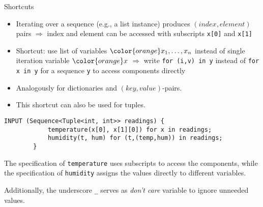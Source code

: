 \documentclass[%
beamer,%
english,%
10pt,%
]{beamer}
\newcommand{\blue}[1]{{\color{blue}#1}}
\newcommand{\orange}[1]{{\color{orange}#1}}
\begin{document}
\begin{frame}[fragile]{Shortcuts}
    \begin{itemize}
        \item Iterating over a sequence (e.g., a \blue{list} instance) produces $(\mathit{index},\mathit{element})$ pairs
            $\Rightarrow$ index and element can be accessed with subscripts \blue{\lstinline{x[0]}} and \blue{\lstinline{x[1]}}

        \item Shortcut:
            use list of variables $\orange{x_1,\dots,x_n}$ instead of single iteration variable $\orange{x}$
            $\Rightarrow$ write \blue{\lstinline{for (i,v) in y}} instead of \blue{\lstinline{for x in y}} for a sequence \blue{\lstinline{y}}
            to access components directly

        \item Analogously for dictionaries and $(\mathit{key},\mathit{value})$-pairs.

        \item This shortcut can also be used for \blue{tuples}.
    \end{itemize}



    \begin{example}
        \begin{lstlisting}[basicstyle=\footnotesize,autogobble]
        INPUT (Sequence<Tuple<int, int>> readings) {
            temperature(x[0], x[1][0]) for x in readings;
            humidity(t, hum) for (t,(temp,hum)) in readings;
        }
        \end{lstlisting}
        The specification of \lstinline{temperature} uses subscripts to access the components,
        while the specification of \lstinline{humidity} assigns the values directly to different variables.
    \end{example}

    Additionally, the underscore \blue{\lstinline{_}} serves as \emph{don't care} variable to ignore unneeded values.
\end{frame}
\end{document}
